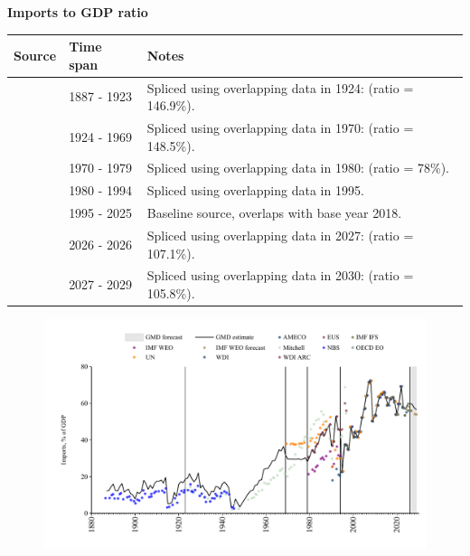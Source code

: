 \documentclass[12pt,a4paper,landscape]{article}
\begin{document}
\begin{adjustbox}{max totalsize={\paperwidth}{\paperheight},center}
\begin{minipage}[t][\textheight][t]{\textwidth}
\vspace*{0.5cm}
{}
\begin{center}
{\Large\bfseries Imports to GDP ratio}
\end{center}
\vspace{0.5cm}
\begin{table}[H]
\centering
\small
\begin{tabular}{|l|l|l|}
\hline
\textbf{Source} & \textbf{Time span} & \textbf{Notes} \\
\hline
\rowcolor{white}\cite{NBS}& 1887 - 1923 &Spliced using overlapping data in 1924: (ratio = 146.9\%). \\
\rowcolor{lightgray}\cite{Mitchell}& 1924 - 1969 &Spliced using overlapping data in 1970: (ratio = 148.5\%). \\
\rowcolor{white}\cite{UN}& 1970 - 1979 &Spliced using overlapping data in 1980: (ratio = 78\%). \\
\rowcolor{lightgray}\cite{WDI}& 1980 - 1994 &Spliced using overlapping data in 1995. \\
\rowcolor{white}\cite{OECD_EO}& 1995 - 2025 &Baseline source, overlaps with base year 2018. \\
\rowcolor{lightgray}\cite{AMECO}& 2026 - 2026 &Spliced using overlapping data in 2027: (ratio = 107.1\%). \\
\rowcolor{white}\cite{IMF_WEO_forecast}& 2027 - 2029 &Spliced using overlapping data in 2030: (ratio = 105.8\%). \\
\hline
\end{tabular}
\end{table}
\begin{figure}[H]
\centering
\includegraphics[width=\textwidth,height=0.6\textheight,keepaspectratio]{graphs/BGR_imports_GDP.pdf}
\end{figure}
\end{minipage}
\end{adjustbox}
\end{document}
